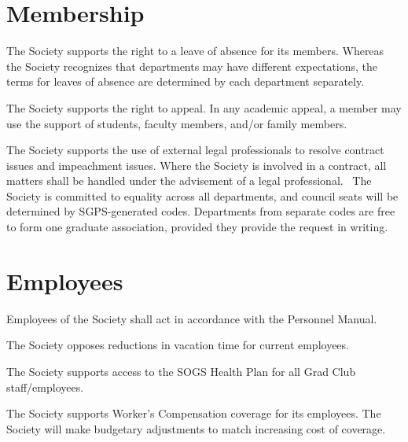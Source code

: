 \section{Membership}
\begin{longenum}[ label*=\thesection.\arabic*., align=left]
\item The Society supports the right to a leave of absence for its members. Whereas the Society recognizes that departments may have different expectations, the terms for leaves of absence are determined by each department separately.
\item The Society supports the right to appeal. In any academic appeal, a member may use the support of students, faculty members, and/or family members.
\item The Society supports the use of external legal professionals to resolve contract issues and impeachment issues. Where the Society is involved in a contract, all matters shall be handled under the advisement of a legal professional.
\ The Society is committed to equality across all departments, and council seats will be determined by SGPS-generated codes. Departments from separate codes are free to form one graduate association, provided they provide the request in writing.
\end{longenum}

\section{Employees}
\begin{longenum}[ label*=\thesection.\arabic*., align=left]
\item Employees of the Society shall act in accordance with the Personnel Manual.
\item The Society opposes reductions in vacation time for current employees.
\item The Society supports access to the SOGS Health Plan for all Grad Club staff/employees.
\item The Society supports Worker’s Compensation coverage for its employees. The Society will make budgetary adjustments to match increasing cost of coverage.
\end{longenum}

